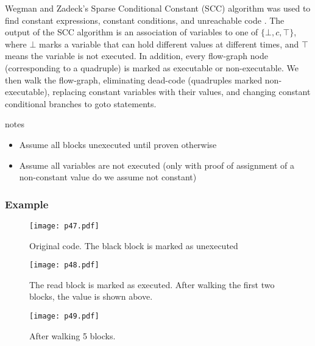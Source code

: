 Wegman and Zadeck's Sparse Conditional Constant (SCC) algorithm was used to find constant expressions, 
constant conditions, and unreachable code \cite{wegman1991constant}. The output of the SCC algorithm is 
an association of variables to one of $\lbrace \bot, c, \top \rbrace$, where $\bot$ marks a variable that
 can hold different values at different times, and $\top$ means the variable is not executed. In addition, 
 every flow-graph node (corresponding to a quadruple) is marked as executable or non-executable. 
 We then walk the flow-graph, eliminating dead-code (quadruples marked non-executable), replacing 
 constant variables with their values, and changing constant conditional branches to goto statements.

\begin{note}{notes}
	\begin{itemize}
		\item Assume all blocks unexecuted until proven otherwise
		\item Assume all variables are not executed (only with proof of assignment of a non-constant value do we assume not constant)
	\end{itemize}
\end{note}

\subsubsection{Example}

\begin{figure}[H]
	\centering
	\texttt{[image: p47.pdf]}
	\caption{Original code. The black block is marked as unexecuted}
	\label{fig:p47}

\end{figure}




\begin{figure}[H]
	\centering
	\texttt{[image: p48.pdf]}
	\caption{The read block is marked as executed. After walking the first two blocks, the value is shown above.}
	\label{fig:p48}

\end{figure}



\begin{figure}[H]
	\centering
	\texttt{[image: p49.pdf]}
	\caption{After walking 5 blocks.}
	\label{fig:p49}

\end{figure}



